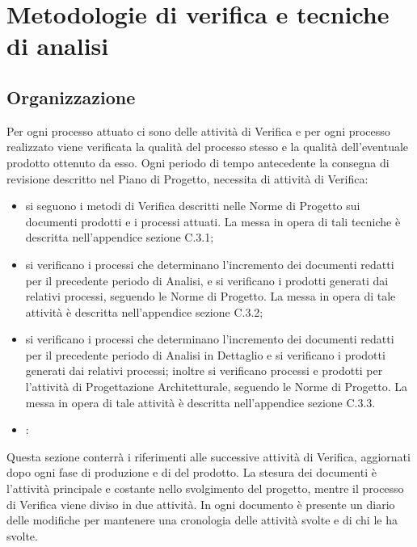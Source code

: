\newpage

\section{Metodologie di verifica e tecniche di analisi}
\subsection{Organizzazione} %
\label{2.4}
Per ogni processo attuato ci sono delle attività di Verifica e per ogni processo realizzato viene verificata la qualità del processo stesso e la qualità dell'eventuale prodotto ottenuto da esso.
Ogni periodo di tempo antecedente la consegna di revisione descritto nel Piano di Progetto, necessita di attività di Verifica:
\begin{itemize}
\item {} si seguono i metodi di Verifica descritti nelle Norme di Progetto sui documenti prodotti e i processi attuati. La messa in opera di tali tecniche è descritta nell'appendice sezione C.3.1;
\item{} si verificano i processi che determinano l'incremento dei documenti redatti per il precedente periodo di Analisi, e si verificano i prodotti generati dai relativi processi, seguendo le Norme di Progetto. La messa in opera di tale attività è descritta nell'appendice sezione C.3.2;
\item{}  si verificano i processi che determinano l'incremento dei documenti redatti per il precedente periodo di Analisi in Dettaglio e si verificano i prodotti generati dai relativi processi; inoltre si verificano processi e prodotti per l'attività di Progettazione Architetturale, seguendo le Norme di Progetto. La messa in opera di tale attività è descritta nell'appendice sezione C.3.3.
\item {}:
\end{itemize}
Questa sezione conterrà i riferimenti alle successive attività di Verifica, aggiornati dopo ogni fase di produzione e di  del prodotto.
La stesura dei documenti è l'attività principale e costante nello svolgimento del progetto, mentre il processo di Verifica viene diviso in due attività.
In ogni documento è presente un diario delle modifiche per mantenere una cronologia delle attività svolte e di chi le ha svolte.

